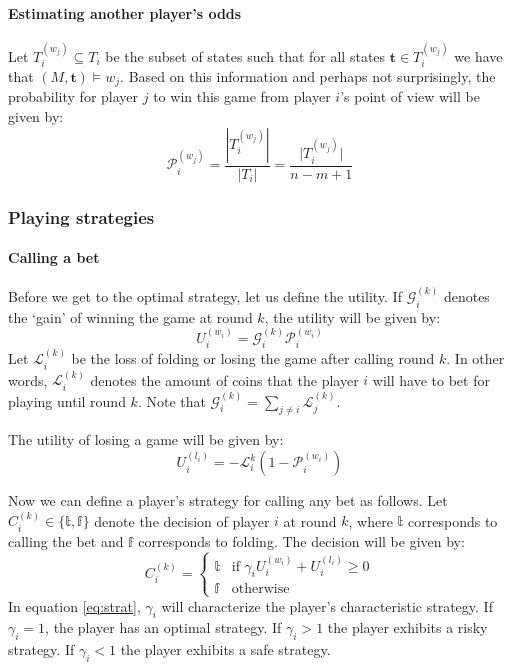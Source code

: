 \documentclass[a4paper,10pt]{article}
\begin{document}
\paragraph{Estimating another player's odds}
Let $T^{(w_j)}_i \subseteq T_i$ be the subset of states such that for all states $\boldsymbol t \in T^{(w_j)}_i$ we have that $(M,\boldsymbol t) \models w_j$. Based on this information and perhaps not surprisingly, the probability for player $j$ to win this game from player $i$'s point of view will be given by:
\begin{equation}
\mathcal{P}^{(w_j)}_i = \frac{|T^{(w_j)}_i|}{|T_i|} = \frac{\lvert T^{(w_j)}_i\rvert}{n-m+1} \label{eq:prob}
\end{equation}


\subsubsection{Playing strategies}
\paragraph{Calling a bet}
Before we get to the optimal strategy, let us define the utility. If $\mathcal G^{(k)}_i$ denotes the `gain' of winning the game at round $k$, the utility will be given by:
\begin{equation}
 U^{(w_i)}_i = \mathcal G^{(k)}_i \mathcal P^{(w_i)}_i
\label{eq:util}
 \end{equation}
Let $\mathcal{L}^{(k)}_i$ be the loss of folding or losing the game after calling round $k$. In other words, $\mathcal L^{(k)}_i$ denotes the amount of coins that the player $i$ will have to bet for playing until round $k$. Note that $\displaystyle \mathcal G^{(k)}_i = \sum_{j\neq i} \mathcal L^{(k)}_j$. 

The utility of losing a game will be given by:
\begin{equation}
 U^{(l_i)}_i = -\mathcal L^{k}_i (1-\mathcal P^{(w_i)}_i)
 \label{eq:loss}
\end{equation}

Now we can define a player's strategy for calling any bet as follows. Let $C_i^{(k)} \in \{\mathbb t, \mathbb f\}$ denote the decision of player $i$ at round $k$, where $\mathbb t$ corresponds to calling the bet and $\mathbb f$ corresponds to folding. The decision will be given by:
\begin{equation}
C_i^{(k)}  =
\begin{cases}
 \mathbb t & \text{if } \gamma_i U^{(w_i)}_i + U^{(l_i)}_i \geq 0\\
 \mathbb f & \text{otherwise}
\end{cases}
\label{eq:strat}
\end{equation}
In equation \ref{eq:strat}, $\gamma_i$ will characterize the player's characteristic strategy. If $\gamma_i = 1$, the player has an optimal strategy. If $\gamma_i > 1$ the player exhibits a risky strategy. If $\gamma_i < 1$ the player exhibits a safe strategy.
\end{document}
